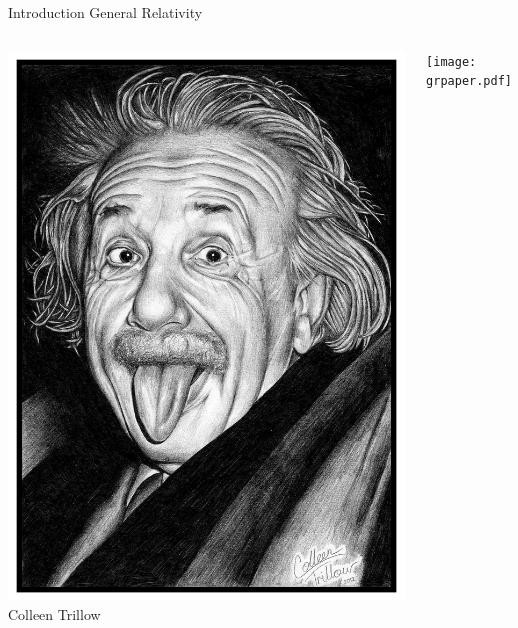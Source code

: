 \documentclass[xcolor=dvipsnames]{beamer}
\begin{document}
	\begin{frame}{Introduction}
		General Relativity
		\begin{columns}[c]
			\column{2in}
			\begin{center}
				\includegraphics[scale=0.07]{einstein.jpg}\\
				\tiny{Colleen Trillow}
			\end{center}
			\column{2in}
			\begin{center}
				\texttt{[image: grpaper.pdf]}
			\end{center}
		\end{columns}
	\end{frame}
\end{document}
